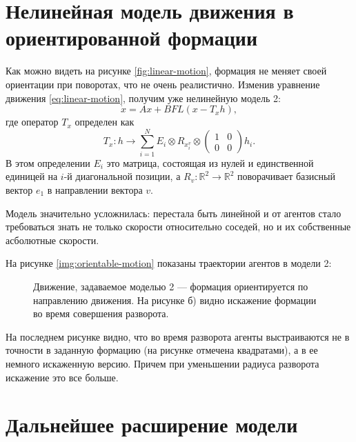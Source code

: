 \section{Нелинейная модель движения в ориентированной формации}
Как можно видеть на рисунке \ref{fig:linear-motion}, формация не меняет своей ориентации при поворотах, что не очень реалистично. Изменив уравнение движения \ref{eq:linear-motion}, получим уже нелинейную модель 2:
\begin{equation}
\dot{x}=Ax+BFL(x-T_x h),
\label{eq:orientable-motion}
\end{equation}
где оператор $T_x$ определен как
\begin{equation}
T_x:h\rightarrow \sum^N_{i=1}E_i\otimes R_{x^v_i}\otimes
\left( 
\begin{array}{cc}
1 & 0 \\
0 & 0 \end{array} \right) h_i.
\end{equation}
В этом определении $E_i$ это матрица, состоящая из нулей и единственной единицей на $i$-й диагональной позиции, а $R_v:\mathbb{R}^2\rightarrow\mathbb{R}^2$ поворачивает базисный вектор $e_1$ в направлении вектора $v$.

Модель значительно усложнилась: перестала быть линейной и от агентов стало требоваться знать не только скорости относительно соседей, но и их собственные асболютные скорости.

На рисунке \ref{img:orientable-motion} показаны траектории агентов в модели 2:

\begin{figure}[h]
  \begin{minipage}[h]{0.45\linewidth}
  \end{minipage}
  \hfill
  \begin{minipage}[h]{0.45\linewidth}
  \end{minipage}
  \caption{Движение, задаваемое моделью 2 --- формация ориентируется по направлению движения. На рисунке б) видно искажение формации во время совершения разворота.}
\label{fig:orientable-motion-1}
\end{figure}

На последнем рисунке видно, что во время разворота агенты выстраиваются не в точности в заданную формацию (на рисунке отмечена квадратами), а в ее немного искаженную версию. Причем при уменьшении радиуса разворота искажение это все больше.

\section{Дальнейшее расширение модели}

\clearpage
